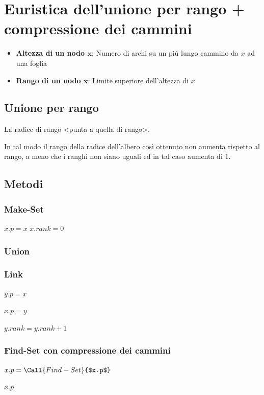\newpage
\section{Euristica dell'unione per rango + compressione dei cammini}
\begin{itemize}
    \item \textbf{Altezza di un nodo $\mathbf{x}$}: Numero di archi su un più lungo cammino da $x$ ad una foglia
    \item \textbf{Rango di un nodo $\mathbf{x}$}: Limite superiore dell'altezza di $x$
\end{itemize}

\subsection{Unione per rango}
La radice di rango <punta a quella di rango>.

In tal modo il rango della radice dell'albero così ottenuto non aumenta rispetto al rango, a meno che i ranghi non siano uguali ed in tal caso aumenta di 1.

\subsection{Metodi}

\subsubsection{Make-Set}
\begin{algorithmic}
        \State $x.p = x$
        \State $x.rank = 0$
    \EndProcedure
\end{algorithmic}

\subsubsection{Union}
\begin{algorithmic}
        \State {}
    \EndProcedure
\end{algorithmic}

\subsubsection{Link}
\begin{algorithmic}
            \State $y.p = x$

            \Else
                \State $x.p = y$

                        \State $y.rank = y.rank + 1$
                    \EndIf
        \EndIf
    \EndProcedure
\end{algorithmic}

\subsubsection{Find-Set con compressione dei cammini}
\begin{algorithmic}
            \State $x.p = \Call{Find-Set}{$x.p$}$
        \EndIf

        \State \Return $x.p$
    \EndProcedure
\end{algorithmic}





